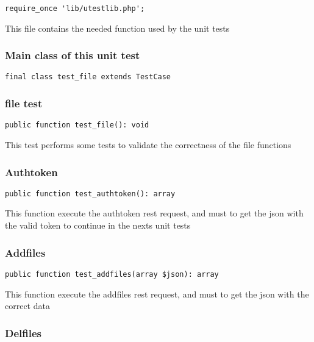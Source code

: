 \documentclass[a4paper]{article}
\begin{document}
\begin{lstlisting}
require_once 'lib/utestlib.php';
\end{lstlisting}

This file contains the needed function used by the unit tests

\hypertarget{toc190}{}
\subsubsection{Main class of this unit test}

\begin{lstlisting}
final class test_file extends TestCase
\end{lstlisting}

\hypertarget{toc191}{}
\subsubsection{file test}

\begin{lstlisting}
public function test_file(): void
\end{lstlisting}

This test performs some tests to validate the correctness
of the file functions

\hypertarget{toc192}{}
\subsubsection{Authtoken}

\begin{lstlisting}
public function test_authtoken(): array
\end{lstlisting}

This function execute the authtoken rest request, and must to get the
json with the valid token to continue in the nexts unit tests

\hypertarget{toc193}{}
\subsubsection{Addfiles}

\begin{lstlisting}
public function test_addfiles(array $json): array
\end{lstlisting}

This function execute the addfiles rest request, and must to get the
json with the correct data

\hypertarget{toc194}{}
\subsubsection{Delfiles}
\end{document}
